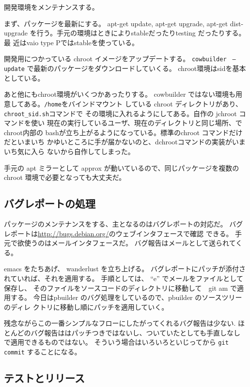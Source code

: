 \documentclass[mingoth,a4paper]{jsarticle}
\begin{document}
開発環境をメンテナンスする。

まず、パッケージを最新にする。 apt-get update, apt-get upgrade, apt-get
dist-upgrade を行う。手元の環境はときによりstableだったりtesting だったりする。最
近はvaio type Pではstableを使っている。

開発用につかっている chroot イメージをアップデートする。
\texttt{cowbuilder　--update} で最新のパッケージをダウンロードしていくる。
chroot環境はsidを基本としている。

あと他にもchroot環境がいくつかあったりする。
cowbuilder ではない環境も用意してある。\texttt{/home}をバインドマウント
している chroot ディレクトリがあり、\verb!chroot_sid.sh!コマンドで
その環境に入れるようにしてある。自作の jchroot コマンドを使い
現在の実行しているユーザ、現在のディレクトリと同じ場所、でchroot内部の
bashが立ち上がるようになっている。標準のchroot コマンドだけだといまいち
かゆいところに手が届かないのと、dchrootコマンドの実装がいまいち気に入ら
ないから自作してしまった。

手元の apt ミラーとして approx が動いているので、同じパッケージを複数の
chroot 環境で必要となっても大丈夫だ。

\subsection{バグレポートの処理}

パッケージのメンテナンスをする、主となるのはバグレポートの対応だ。
バグレポートは\url{http://bugs.debian.org/}のウェブインタフェースで確認
できる。
手元で欲使うのはメールインタフェースだ。
バグ報告はメールとして送られてくる。

emacs をたちあげ、 wanderlust を立ち上げる。
バグレポートにパッチが添付されていれば、それを適用する。
手順としては、 ``e'' でメールをファイルとして保存し、
そのファイルをソースコードのディレクトリに移動して　git am で適用する。
今日はpbuilder のバグ処理をしているので、pbuilder のソースツリーのディレ
クトリに移動し順にパッチを適用していく。

残念ながらこの一番シンプルなフローにしたがってくれるバグ報告は少ない.
ほとんどのバグ報告ははパッチつきではないし、ついていたとしても手直しなし
で適用できるものではない。
そういう場合はいろいろといじってから \texttt{git commit} することになる。

\subsection{テストとリリース}
\end{document}
